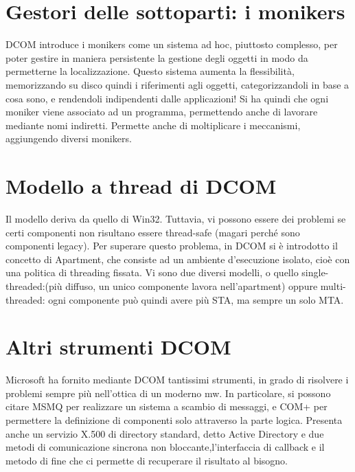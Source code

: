\section{Gestori delle sottoparti: i monikers}
DCOM introduce i monikers come un sistema ad hoc, piuttosto complesso, per poter gestire in maniera persistente la
gestione degli oggetti in modo da permetterne la localizzazione. Questo sistema aumenta la flessibilità, memorizzando su disco quindi i riferimenti agli oggetti,
categorizzandoli in base a cosa sono, e rendendoli indipendenti dalle applicazioni!
Si ha quindi che ogni moniker viene associato ad un programma, permettendo anche di lavorare mediante nomi indiretti.
Permette anche di moltiplicare i meccanismi, aggiungendo diversi monikers.
\section{Modello a thread di DCOM}
Il modello deriva da quello di Win32. Tuttavia, vi possono essere dei problemi se certi componenti non risultano essere
thread-safe (magari perché sono componenti legacy). Per superare questo problema, in DCOM si è introdotto il concetto di
Apartment, che consiste ad un ambiente d'esecuzione isolato, cioè con una politica di threading fissata. Vi sono due
diversi modelli, o quello single-threaded:(più diffuso, un unico componente lavora nell'apartment) oppure
multi-threaded: ogni componente può quindi avere più STA, ma sempre un solo MTA.
\section{Altri strumenti DCOM}
Microsoft ha fornito mediante DCOM tantissimi strumenti, in grado di risolvere i problemi sempre più nell'ottica di un
moderno mw.
In particolare, si possono citare MSMQ per realizzare un sistema a scambio di messaggi, e COM+ per permettere la
definizione di componenti solo attraverso la parte logica. Presenta anche un servizio X.500 di directory standard, detto Active Directory e due metodi di comunicazione sincrona non bloccante,l'interfaccia di callback e il metodo di fine che ci permette di recuperare il risultato al bisogno.

